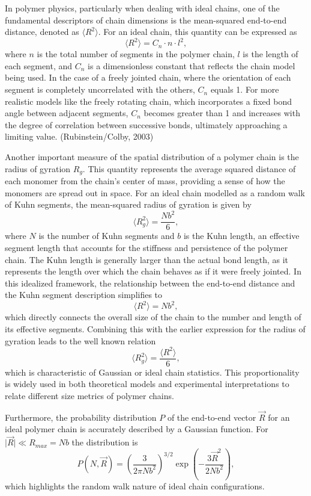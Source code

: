 \documentclass{article}      %
\begin{document}
In polymer physics, particularly when dealing with ideal chains, one of the fundamental descriptors of chain dimensions is the mean-squared end-to-end distance, denoted as $\langle R^2 \rangle$. For an ideal chain, this quantity can be expressed as
\[
\langle R^2 \rangle = C_n \cdot n \cdot l^2,
\]
where $n$ is the total number of segments in the polymer chain, $l$ is the length of each segment, and $C_n$ is a dimensionless constant that reflects the chain model being used. In the case of a freely jointed chain, where the orientation of each segment is completely uncorrelated with the others, $C_n$ equals 1. For more realistic models like the freely rotating chain, which incorporates a fixed bond angle between adjacent segments, $C_n$ becomes greater than 1 and increases with the degree of correlation between successive bonds, ultimately approaching a limiting value. (Rubinstein/Colby, 2003)

Another important measure of the spatial distribution of a polymer chain is the radius of gyration $R_g$. This quantity represents the average squared distance of each monomer from the chain’s center of mass, providing a sense of how the monomers are spread out in space. For an ideal chain modelled as a random walk of Kuhn segments, the mean-squared radius of gyration is given by
\[
\langle R_g^2 \rangle = \frac{N b^2}{6},
\]
where $N$ is the number of Kuhn segments and $b$ is the Kuhn length, an effective segment length that accounts for the stiffness and persistence of the polymer chain. The Kuhn length is generally larger than the actual bond length, as it represents the length over which the chain behaves as if it were freely jointed.
In this idealized framework, the relationship between the end-to-end distance and the Kuhn segment description simplifies to
\[
\langle R^2 \rangle = N b^2,
\]
which directly connects the overall size of the chain to the number and length of its effective segments. Combining this with the earlier expression for the radius of gyration leads to the well known relation
\[
\langle R_g^2 \rangle = \frac{\langle R^2 \rangle}{6},
\]
which is characteristic of Gaussian or ideal chain statistics. This proportionality is widely used in both theoretical models and experimental interpretations to relate different size metrics of polymer chains.

Furthermore, the probability distribution $P$ of the end-to-end vector $\vec{R}$ for an ideal polymer chain is accurately described by a Gaussian function. For $\vert \vec{R} \vert \ll R_{max} = Nb $ the distribution is
\[
P(N, \vec{R}) = \left( \frac{3}{2 \pi N b^2} \right)^{3/2} \exp\left( -\frac{3 \vec{R}^2}{2 N b^2} \right),
\]
which highlights the random walk nature of ideal chain configurations.
\end{document}
